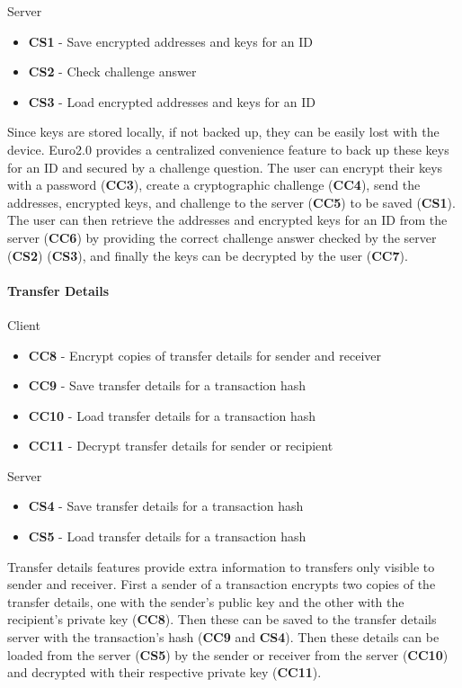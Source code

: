 \documentclass[a4paper,12pt]{article} %
\begin{document}
{{Server
\begin{itemize}
	\item \textbf{CS1} - Save encrypted addresses and keys for an ID
	\item \textbf{CS2} - Check challenge answer
	\item \textbf{CS3} - Load encrypted addresses and keys for an ID
\end{itemize}

Since keys are stored locally, if not backed up, they can be easily lost with the device. Euro2.0 provides a centralized convenience feature to back up these keys for an ID and secured by a challenge question. The user can encrypt their keys with a password (\textbf{CC3}), create a cryptographic challenge (\textbf{CC4}), send the addresses, encrypted keys, and challenge to the server (\textbf{CC5}) to be saved (\textbf{CS1}). The user can then retrieve the addresses and encrypted keys for an ID from the server (\textbf{CC6}) by providing the correct challenge answer checked by the server (\textbf{CS2}) (\textbf{CS3}), and finally the keys can be decrypted by the user (\textbf{CC7}).

\paragraph*{Transfer Details}

Client
\begin{itemize}
	\item \textbf{CC8} - Encrypt copies of transfer details for sender and receiver
	\item \textbf{CC9} - Save transfer details for a transaction hash
	\item \textbf{CC10} - Load transfer details for a transaction hash
	\item \textbf{CC11} - Decrypt transfer details for sender or recipient
\end{itemize}

Server
\begin{itemize}
	\item \textbf{CS4} - Save transfer details for a transaction hash
	\item \textbf{CS5} - Load transfer details for a transaction hash
\end{itemize}

Transfer details features provide extra information to transfers only visible to sender and receiver. First a sender of a transaction encrypts two copies of the transfer details, one with the sender's public key and the other with the recipient's private key (\textbf{CC8}). Then these can be saved to the transfer details server with the transaction's hash (\textbf{CC9} and \textbf{CS4}). Then these details can be loaded from the server (\textbf{CS5}) by the sender or receiver from the server (\textbf{CC10}) and decrypted with their respective private key (\textbf{CC11}).

}}
\end{document}
